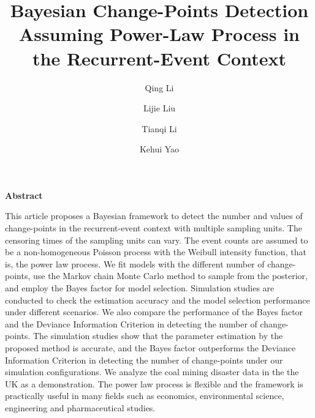 \documentclass[12pt]{article}
\numberwithin{equation}{section}
\begin{document}
\makeatletter
\renewcommand{\maketitle}{\bgroup\setlength{\parindent}{0pt}
	\begin{flushleft}
		\textbf{\@title}\vspace{12pt}
		
		\@author
	\end{flushleft}\egroup
}
\makeatother
\title{Bayesian Change-Points Detection Assuming Power-Law Process in the Recurrent-Event Context}
\author[1]{Qing Li}
\author[2]{Lijie Liu}
\author[2]{Tianqi Li}
\author[2]{Kehui Yao}
\date{}
\maketitle
{}
\noindent \textbf{Abstract}

\noindent This article proposes a Bayesian framework to detect the number and values of change-points in the recurrent-event context with multiple sampling units. The censoring times of the sampling units can vary.  The event counts are assumed to be a non-homogeneous Poisson process with the Weibull intensity function, that is, the power law process. We fit models with the different number of change-points, use the Markov chain Monte Carlo method to sample from the posterior, and employ the Bayes factor for model selection. Simulation studies are conducted to check the estimation accuracy and the model selection performance under different scenarios. We also compare the performance of the Bayes factor and the Deviance Information Criterion in detecting the number of change-points. The simulation studies show that the parameter estimation by the proposed method is accurate, and the Bayes factor outperforms the Deviance Information Criterion in detecting the number of change-points under our simulation configurations. We analyze the coal mining disaster data in the the UK as a demonstration. The power law process is flexible and the framework is practically useful in many fields such as economics, environmental science, engineering and pharmaceutical studies.      
\end{document}
